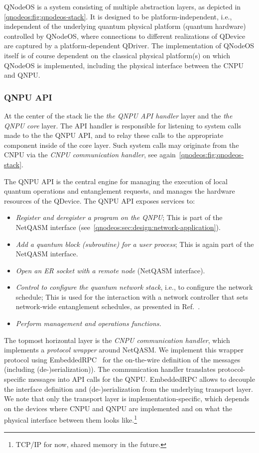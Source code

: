 \ac{QNodeOS} is a system consisting of multiple abstraction layers, as depicted in \cref{qnodeos:fig:qnodeos-stack}. It is designed to be platform-independent, i.e., independent of the underlying quantum physical platform (quantum hardware) controlled by \ac{QNodeOS}, where connections to different realizations of \ac{QDevice} are captured by a platform-dependent \ac{QDriver}. The implementation of \ac{QNodeOS} itself is of course dependent on the classical physical platform(s) on which \ac{QNodeOS} is implemented, including the physical interface between the \ac{CNPU} and \ac{QNPU}.

\subsubsection{QNPU API}
\label{qnodeos:sec:QNPU-api}

At the center of the stack lie the \emph{the \ac{QNPU} \ac{API} handler} layer and the \emph{the \ac{QNPU} core} layer. The \ac{API} handler is responsible for listening to system calls made to the the \ac{QNPU} \ac{API}, and to relay these calls to the appropriate component inside of the core layer. Such system calls may originate from the \ac{CNPU} via the \emph{CNPU communication handler}, see again~\cref{qnodeos:fig:qnodeos-stack}. 

The \ac{QNPU} \ac{API} is the central engine for managing the execution of local quantum operations and entanglement requests, and manages the hardware resources of the \ac{QDevice}. The \ac{QNPU} \ac{API} exposes services to:
%
\begin{itemize}
\item \emph{Register and deregister a program on the \ac{QNPU}}; This is part of the \ac{NetQASM} interface (see~\cref{qnodeos:sec:design:network-application}).
\item \emph{Add a quantum block (subroutine) for a user process}; This is again part of the \ac{NetQASM} interface.
\item \emph{Open an \ac{ER} socket with a remote node} (\ac{NetQASM} interface).
\item \emph{Control to configure the quantum network stack}, i.e., to configure the network schedule; This is used for the interaction with a network controller that sets network-wide entanglement schedules, as presented in Ref.~\cite{skrzypczyk_2021_arch}.
\item \emph{Perform management and operations functions.}
\end{itemize}
%
The topmost horizontal layer is the \emph{\ac{CNPU} communication handler}, which implements a \emph{protocol wrapper} around \ac{NetQASM}.
We implement this wrapper protocol using EmbeddedRPC~\cite{erpc} for the on-the-wire definition of the messages (including (de-)serialization)). The communication handler translates protocol-specific messages into \ac{API} calls for the \ac{QNPU}. EmbeddedRPC allows to decouple the interface definition and (de-)serialization from the underlying transport layer. We note that only the transport layer is implementation-specific, which depends on the devices where \ac{CNPU} and \ac{QNPU} are implemented and on what the physical interface between them looks like.\footnote{TCP/IP for now, shared memory in the future.}

